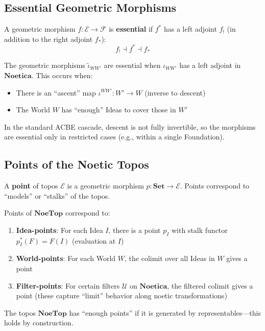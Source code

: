 \subsection{Essential Geometric Morphisms}
\label{subsec:essential-geometric}

\begin{definition}
\label{def:essential-geometric}
A geometric morphism $f : \mathcal{E} \to \mathcal{F}$ is \textbf{essential}
if $f^*$ has a left adjoint $f_!$ (in addition to the right adjoint $f_*$):
\[
  f_! \dashv f^* \dashv f_*
\]
\end{definition}

\begin{proposition}
\label{prop:acbe-essential}
The geometric morphisms $\tilde{\iota}_{WW'}$ are essential when $\iota_{WW'}$
has a left adjoint in $\mathbf{Noetica}$. This occurs when:
\begin{itemize}
  \item There is an ``ascent'' map $\iota^{WW'} : W' \to W$ (inverse to descent)
  \item The World $W$ has ``enough'' Ideas to cover those in $W'$
\end{itemize}
In the standard ACBE cascade, descent is not fully invertible, so the morphisms
are essential only in restricted cases (e.g., within a single Foundation).
\end{proposition}

\subsection{Points of the Noetic Topos}
\label{subsec:topos-points}

\begin{definition}
\label{def:topos-point}
A \textbf{point} of topos $\mathcal{E}$ is a geometric morphism $p : \mathbf{Set} \to \mathcal{E}$.
Points correspond to ``models'' or ``stalks'' of the topos.
\end{definition}

\begin{proposition}
\label{prop:noetic-points}
Points of $\mathbf{NoeTop}$ correspond to:
\begin{enumerate}[label=(\alph*)]
  \item \textbf{Idea-points}: For each Idea $I$, there is a point $p_I$ with
        stalk functor $p_I^*(F) = F(I)$ (evaluation at $I$)
  \item \textbf{World-points}: For each World $W$, the colimit over all Ideas
        in $W$ gives a point
  \item \textbf{Filter-points}: For certain filters $\mathcal{U}$ on $\mathbf{Noetica}$,
        the filtered colimit gives a point (these capture ``limit'' behavior
        along noetic transformations)
\end{enumerate}
The topos $\mathbf{NoeTop}$ has ``enough points'' if it is generated by
representables---this holds by construction.
\end{proposition}

